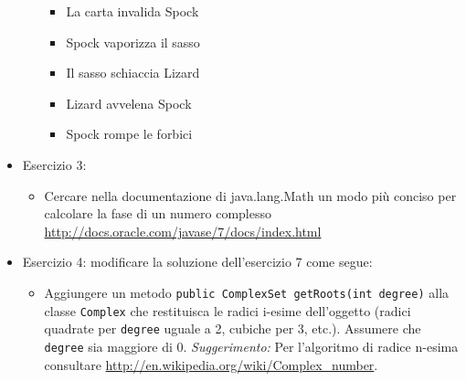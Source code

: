 \documentclass{article}
\begin{document}
\begin{itemize}
\begin{itemize}
\begin{itemize}
			\item La carta invalida Spock
			\item Spock vaporizza il sasso
			\item Il sasso schiaccia Lizard
			\item Lizard avvelena Spock
			\item Spock rompe le forbici
	\end{itemize}
\end{itemize}
\item Esercizio 3:
\begin{itemize}
\item Cercare nella documentazione di java.lang.Math un modo pi\`u conciso per calcolare la fase di un numero complesso
\url{http://docs.oracle.com/javase/7/docs/index.html}
\end{itemize}
\item Esercizio 4: modificare la soluzione dell'esercizio 7 come segue:
\begin{itemize}
	\item Aggiungere un metodo \texttt{public ComplexSet getRoots(int degree)} alla classe \texttt{Complex}
	che restituisca le radici i-esime dell'oggetto (radici quadrate per \texttt{degree} uguale a 2, cubiche per 3, etc.).
	Assumere che \texttt{degree} sia maggiore di 0.
	\emph{Suggerimento:} Per l'algoritmo di radice n-esima consultare \url{http://en.wikipedia.org/wiki/Complex_number}.
\end{itemize}
\end{itemize}

\clearpage







\nocite{*}
\end{document}
